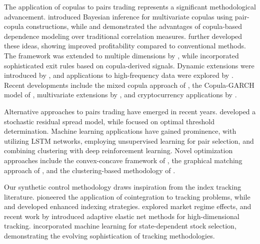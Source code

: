 The application of copulas to pairs trading represents a significant methodological advancement. \cite{Min2010} introduced Bayesian inference for multivariate copulas using pair-copula constructions, while \cite{stander2013trading} and \cite{Liew2013} demonstrated the advantages of copula-based dependence modeling over traditional correlation measures. \cite{Xie2016} further developed these ideas, showing improved profitability compared to conventional methods. The framework was extended to multiple dimensions by \cite{lau2016multi}, while \cite{Krauss2017} incorporated sophisticated exit rules based on copula-derived signals. Dynamic extensions were introduced by \cite{zhi2017dynamic}, and applications to high-frequency data were explored by \cite{Chu2018}. Recent developments include the mixed copula approach of \cite{SabinodaSilva2023}, the Copula-GARCH model of \cite{Wang2023}, multivariate extensions by \cite{He2024}, and cryptocurrency applications by \cite{Tadi2025}.

Alternative approaches to pairs trading have emerged in recent years. \cite{do2006new} developed a stochastic residual spread model, while \cite{Zeng2014} focused on optimal threshold determination. Machine learning applications have gained prominence, with \cite{Sarmento2020} utilizing LSTM networks, \cite{Han2023} employing unsupervised learning for pair selection, and \cite{Roychoudhury2023} combining clustering with deep reinforcement learning. Novel optimization approaches include the convex-concave framework of \cite{Johansson2024}, the graphical matching approach of \cite{qureshi2024pairs}, and the clustering-based methodology of \cite{Rotondi2025}.

Our synthetic control methodology draws inspiration from the index tracking literature. \cite{Alexander1999} pioneered the application of cointegration to tracking problems, while \cite{Alexander2002} and \cite{Alexander2005a} developed enhanced indexing strategies. \cite{Alexander2005b} explored market regime effects, and recent work by \cite{Shu2020} introduced adaptive elastic net methods for high-dimensional tracking. \cite{Bradrania2021} incorporated machine learning for state-dependent stock selection, demonstrating the evolving sophistication of tracking methodologies.


